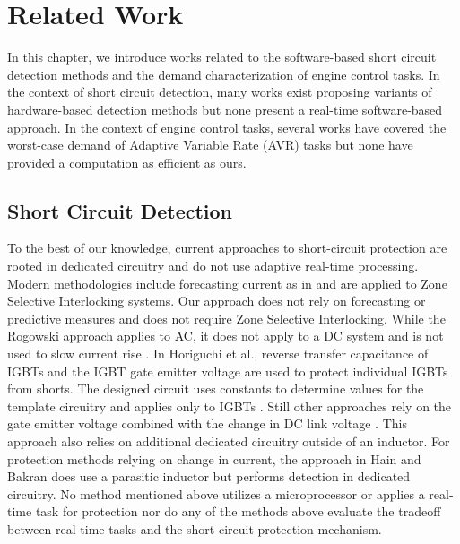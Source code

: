 \section{Related Work}   \label{chap:relatedWork}

In this chapter, we introduce works related to the software-based short circuit detection methods and the demand characterization of engine control tasks.
In the context of short circuit detection, many works exist proposing variants of hardware-based detection methods but none present a real-time software-based approach.
In the context of engine control tasks, several works have covered the worst-case demand of Adaptive Variable Rate (AVR) tasks but none have provided a computation as efficient as ours.

\subsection{Short Circuit Detection} \label{subsec:scd-relatedWork}

To the best of our knowledge, current approaches to short-circuit protection are rooted in dedicated circuitry and do not use adaptive real-time processing.
Modern methodologies include forecasting current as in \cite{du_new_2014} and are applied to Zone Selective Interlocking systems.
Our approach does not rely on forecasting or predictive measures and does not require Zone Selective Interlocking.
While the Rogowski approach applies to AC, it does not apply to a DC system and is not used to slow current rise \cite{wang_new_2011}.
In Horiguchi et al., reverse transfer capacitance of IGBTs and the IGBT gate emitter voltage are used to protect individual IGBTs from shorts.
The designed circuit uses constants to determine values for the template circuitry and applies only to IGBTs \cite{horiguchi_short_2014} \cite{horiguchi_high-speed_2015}.
Still other approaches rely on the gate emitter voltage combined with the change in DC link voltage \cite{krone_fast_2015}.
This approach also relies on additional dedicated circuitry outside of an inductor.
For protection methods relying on change in current, the approach in Hain and Bakran \cite{hain_new_2016} does use a parasitic inductor but performs detection in dedicated circuitry.
No method mentioned above utilizes a microprocessor or applies a real-time task for protection nor do any of the methods above evaluate the tradeoff between real-time tasks and the short-circuit protection mechanism.

